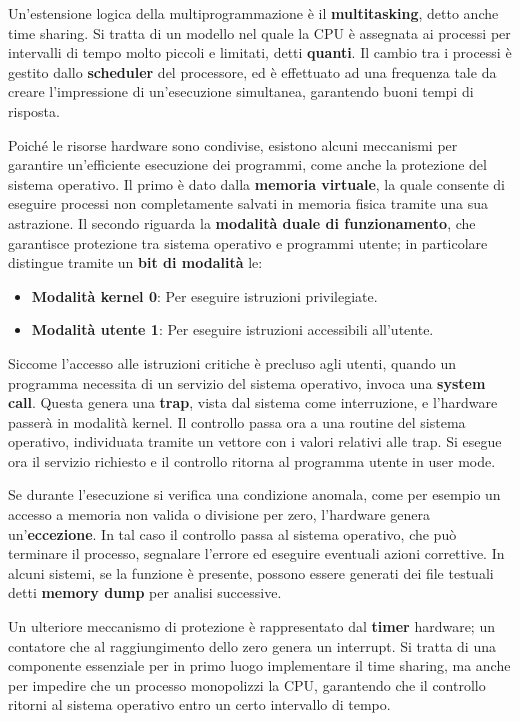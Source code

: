 \noindent Un'estensione logica della multiprogrammazione è il \textbf{multitasking}, detto anche time sharing. Si tratta di un modello nel quale la CPU è assegnata ai processi per intervalli di tempo molto piccoli e limitati, detti \textbf{quanti}. Il cambio tra i processi è gestito dallo \textbf{scheduler} del processore, ed è effettuato ad una frequenza tale da creare l'impressione di un'esecuzione simultanea, garantendo buoni tempi di risposta.\par
Poiché le risorse hardware sono condivise, esistono alcuni meccanismi per garantire un'efficiente esecuzione dei programmi, come anche la protezione del sistema operativo. Il primo è dato dalla \textbf{memoria virtuale}, la quale consente di eseguire processi non completamente salvati in memoria fisica tramite una sua astrazione. Il secondo riguarda la \textbf{modalità duale di funzionamento}, che garantisce protezione tra sistema operativo e programmi utente; in particolare distingue tramite un \textbf{bit di modalità} le: \begin{itemize}
	\item \textbf{Modalità kernel 0}: Per eseguire istruzioni privilegiate.
	\item \textbf{Modalità utente 1}: Per eseguire istruzioni accessibili all'utente.
\end{itemize}
\noindent Siccome l'accesso alle istruzioni critiche è precluso agli utenti, quando un programma necessita di un servizio del sistema operativo, invoca una \textbf{system call}. Questa genera una \textbf{trap}, vista dal sistema come interruzione, e l'hardware passerà in modalità kernel. Il controllo passa ora a una routine del sistema operativo, individuata tramite un vettore con i valori relativi alle trap. Si esegue ora il servizio richiesto e il controllo ritorna al programma utente in user mode.\par
Se durante l'esecuzione si verifica una condizione anomala, come per esempio un accesso a memoria non valida o divisione per zero, l’hardware genera un’\textbf{eccezione}. In tal caso il controllo passa al sistema operativo, che può terminare il processo, segnalare l'errore ed eseguire eventuali azioni correttive. In alcuni sistemi, se la funzione è presente, possono essere generati dei file testuali detti \textbf{memory dump} per analisi successive.\par
Un ulteriore meccanismo di protezione è rappresentato dal \textbf{timer} hardware; un contatore che al raggiungimento dello zero genera un interrupt. Si tratta di una componente essenziale per in primo luogo implementare il time sharing, ma anche per impedire che un processo monopolizzi la CPU, garantendo che il controllo ritorni al sistema operativo entro un certo intervallo di tempo.

